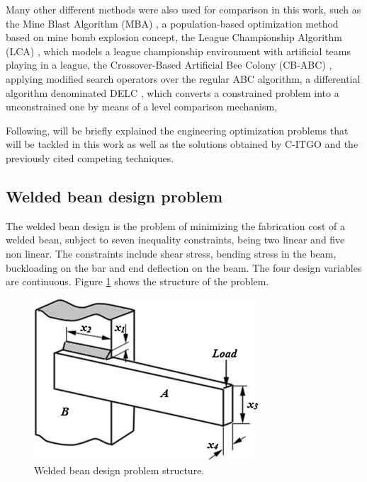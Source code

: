 Many other different methods were also used for comparison in this work, such as the Mine Blast Algorithm (MBA) \citep{MBA}, a population-based optimization method based on mine bomb explosion concept, the League Championship Algorithm (LCA) \cite{LCA}, which models a league championship environment with artificial teams playing in a league, the Crossover-Based Artificial Bee Colony (CB-ABC) \citep{CB-ABC}, applying modified search operators over the regular ABC algorithm, a differential algorithm denominated DELC \citep{DELC}, which converts a constrained problem into a unconstrained one by means of a level comparison mechanism, 

Following, will be briefly explained the engineering optimization problems that will be tackled in this work as well as the solutions obtained by C-ITGO and the previously cited competing techniques.




\subsection{Welded bean design problem}

The welded bean design \citep{WB} is the problem of minimizing the fabrication cost of a welded bean, subject to seven inequality constraints, being two linear and five non linear. The constraints include shear stress, bending stress in the beam, buckloading on the bar and end deflection on the beam. The four design variables are continuous. Figure \ref{fig:WB} shows the structure of the problem.

\begin{figure}[h]
\begin{center}
\includegraphics[scale=0.7]{Imgs/WB.jpg}
\end{center}
\captionsetup{justification=centering}
\caption{Welded bean design problem structure.}\label{fig:WB}
\end{figure}


